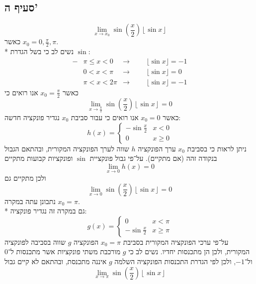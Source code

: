 \subsection{סעיף ה'}
\[
	\lim_{x \to x_0} \sin \left( \frac{x}{2} \right) \left\lfloor \sin x \right\rfloor
\]
כאשר $x_0 = 0, \frac{\pi}{2}, \pi$. \\*
נשים לב כי בשל הגדרת $\sin$:
\begin{align*}
	-&\pi \le x < 0 & \rightarrow && & \lfloor \sin x \rfloor = -1 \\
	& 0 < x < \pi & \rightarrow && & \lfloor \sin x \rfloor = 0 \\
	& \pi < x < 2\pi & \rightarrow && & \lfloor \sin x \rfloor = -1
\end{align*}
כאשר $x_0 = \frac{\pi}{2}$ אנו רואים כי
\[
	\lim_{x \to \frac{\pi}{2}} \sin \left( \frac{x}{2} \right) \left\lfloor \sin x \right\rfloor = 0
\]
כאשר $x_0 = 0$ אנו רואים כי עבור סביבת $x_0$ נגדיר פונקציה חדשה:
\[
	h(x) = \begin{cases}
		-\sin{\frac{x}{2}} & x < 0 \\
		0 & x \ge 0
	\end{cases}
\]
ניתן לראות כי בסביבת $x_0$ ערך הפונקציה $h$ שווה לערך הפונקציה המקורית, ובהתאם הגבול בנקודה זהה (אם מתקיים).
על־פי גבול פונקציית $\sin$ ופונקציות קבועות מתקיים
\[
	\lim_{x \to 0} h(x) = 0
\]
ולכן מתקיים גם
\[
	\lim_{x \to 0} \sin \left( \frac{x}{2} \right) \left\lfloor \sin x \right\rfloor = 0
\]
נתבונן עתה במקרה $x_0 = \pi$. \\*
גם במקרה זה נגדיר פונקציה:
\[
	g(x) = \begin{cases}
		0 & x < \pi \\
		-\sin{\frac{x}{2}} & x \ge \pi
	\end{cases}
\]
על־פי ערכי הפונקציה המקורית בסביבת $x_0 = \pi$ הפונקציה $g$ שווה בסביבה לפונקציה המקורית, ולכן הן מתכנסות יחדיו.
נשים לב כי $g$ מורכבת משתי פונקציות אשר מתכנסות ל־$0$ ול־$-1$, ולכן לפי הגדרת התכנסות הפונקציה השלמה $g$ איננה מתכנסת, ובהתאם לא קיים גבול
\[
	\lim_{x \to \pi} \sin \left( \frac{x}{2} \right) \left\lfloor \sin x \right\rfloor
\]


